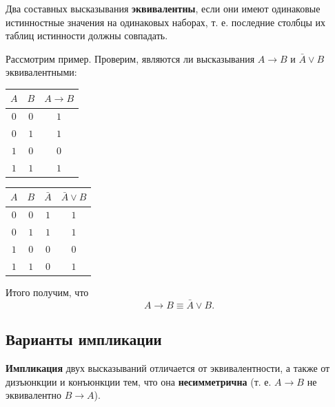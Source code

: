 \documentclass[a5paper, 11pt]{extarticle}
\theoremstyle{definition}
\theoremstyle{definition}
\theoremstyle{definition}
\numberwithin{figure}{section}
\numberwithin{table}{section}
\begin{document}
Два составных высказывания \textbf{эквивалентны}, если они имеют одинаковые истинностные значения на одинаковых наборах, т. е. последние столбцы их таблиц истинности должны совпадать.

Рассмотрим пример. Проверим, являются ли высказывания \(A \to B\) и \(\bar{A} \lor B\) эквивалентными:

\begin{minipage}[c]{0.5\textwidth}
    \renewcommand*{\arraystretch}{1.5}
    \begin{longtable}{|c|c|c|}
        \hline
        \(A\) & \(B\) & \(A \to B\) \\
        \hline
        \(0\) & \(0\) & \(1\)       \\
        \hline
        \(0\) & \(1\) & \(1\)       \\
        \hline
        \(1\) & \(0\) & \(0\)       \\
        \hline
        \(1\) & \(1\) & \(1\)       \\
        \hline
    \end{longtable}
\end{minipage}
\begin{minipage}[c]{0.5\textwidth}
    \renewcommand*{\arraystretch}{1.5}
    \begin{longtable}{|c|c|c|c|}
        \hline
        \(A\) & \(B\) & \(\bar{A}\) & \(\bar{A} \lor B\) \\
        \hline
        \(0\) & \(0\) & \(1\)       & \(1\)              \\
        \hline
        \(0\) & \(1\) & \(1\)       & \(1\)              \\
        \hline
        \(1\) & \(0\) & \(0\)       & \(0\)              \\
        \hline
        \(1\) & \(1\) & \(0\)       & \(1\)              \\
        \hline
    \end{longtable}
\end{minipage}

\vspace*{14pt}

Итого получим, что
\[
    A \to B \equiv \bar{A} \lor B.
\]

\subsection{Варианты импликации}

\textbf{Импликация} двух высказываний отличается от эквивалентности, а также от дизъюнкции и конъюнкции тем, что она \textbf{несимметрична} (т. е. \(A \to B\) не эквивалентно \(B \to A\)).
\end{document}

